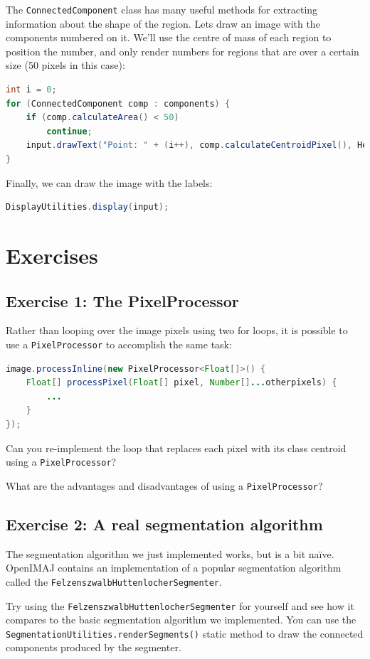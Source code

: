\documentclass[10pt,a4paper,twoside,extrafontsizes]{memoir}
\begin{document}
The \verb+ConnectedComponent+ class has many useful methods for extracting information 
about the shape of the region. Lets draw an image with the components numbered on it. We'll use the 
centre of mass of each region to position the number, and only render numbers for regions that 
are over a certain size (50 pixels in this case):
\begin{lstlisting}[language=java]
int i = 0;
for (ConnectedComponent comp : components) {
    if (comp.calculateArea() < 50) 
        continue;
    input.drawText("Point: " + (i++), comp.calculateCentroidPixel(), HersheyFont.TIMES_MEDIUM,20);
}
\end{lstlisting}
Finally, we can draw the image with the labels:
\begin{lstlisting}[language=java]
DisplayUtilities.display(input);
\end{lstlisting}

\pagebreak
\section*{Exercises}
\subsection*{Exercise 1: The PixelProcessor}
Rather than looping over the image pixels using two for loops, it is possible to use a 
\verb+PixelProcessor+ to accomplish the same task:
\begin{lstlisting}[language=java]
image.processInline(new PixelProcessor<Float[]>() {
    Float[] processPixel(Float[] pixel, Number[]...otherpixels) {
        ...
    }
});
\end{lstlisting}
Can you re-implement the loop that replaces each pixel with its class centroid 
using a \verb+PixelProcessor+? 

What are the advantages and disadvantages of using a \verb+PixelProcessor+?

\subsection*{Exercise 2: A real segmentation algorithm}
The segmentation algorithm we just implemented works, but is a bit na\"ive. OpenIMAJ contains an 
implementation of a popular segmentation algorithm called the \verb+FelzenszwalbHuttenlocherSegmenter+. 

Try using the \verb+FelzenszwalbHuttenlocherSegmenter+ for yourself and see how it compares to the 
basic segmentation algorithm we implemented. You can use the \verb+SegmentationUtilities.renderSegments()+ 
static method to draw the connected components produced by the segmenter.
\end{document}
